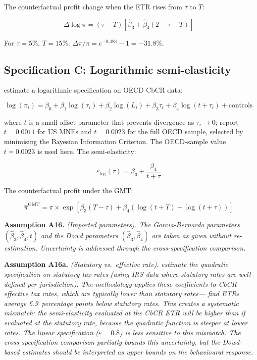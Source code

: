 \documentclass[11pt,a4paper]{article}
\newcommand{\assumption}[2]{\noindent\textbf{Assumption #1.} \textit{#2}\medskip}
\begin{document}
The counterfactual profit change when the ETR rises from $\tau$ to $T$:

\begin{equation}\label{eq:dowd_response}
\Delta \log \pi = (\tau - T)\left[\hat{\beta}_3 + \hat{\beta}_4(2 - \tau - T)\right]
\end{equation}

For $\tau = 5\%$, $T = 15\%$: $\Delta\pi/\pi = e^{-0.383} - 1 = -31.8\%$.

\subsection{Specification C: Logarithmic semi-elasticity}\label{sec:logarithmic}

\citet{garcia2024} estimate a logarithmic specification on OECD CbCR data:

\begin{equation}\label{eq:garcia_spec}
\log(\pi_i) = \beta_0 + \beta_1 \log(\tau_i) + \beta_2 \log(L_i) + \beta_3 \tau_i + \beta_4 \log(t + \tau_i) + \text{controls}
\end{equation}

where $t$ is a small offset parameter that prevents divergence as $\tau_i \to 0$; \citet{garcia2024} report $t = 0.0011$ for US MNEs and $t = 0.0023$ for the full OECD sample, selected by minimising the Bayesian Information Criterion. The OECD-sample value $t = 0.0023$ is used here. The semi-elasticity:

\begin{equation}\label{eq:garcia_se}
\varepsilon_{\log}(\tau) = \beta_3 + \frac{\beta_4}{t + \tau}
\end{equation}

The counterfactual profit under the GMT:

\begin{equation}\label{eq:garcia_response}
\hat{\pi}^{\text{GMT}} = \pi \times \exp\!\left[\beta_3(T - \tau) + \beta_4\left(\log(t + T) - \log(t + \tau)\right)\right]
\end{equation}

\assumption{A16}{(Imported parameters). The Garcia-Bernardo parameters $(\hat{\beta}_3, \hat{\beta}_4, t)$ and the Dowd parameters $(\hat{\beta}_3, \hat{\beta}_4)$ are taken as given without re-estimation. Uncertainty is addressed through the cross-specification comparison.}

\assumption{A16a}{(Statutory vs.\ effective rate). \citet{dowd2017} estimate the quadratic specification on \emph{statutory} tax rates (using IRS data where statutory rates are well-defined per jurisdiction). The methodology applies these coefficients to CbCR \emph{effective} tax rates, which are typically lower than statutory rates---\citet{hugger2025} find ETRs average 6.9~percentage points below statutory rates. This creates a systematic mismatch: the semi-elasticity evaluated at the CbCR ETR will be higher than if evaluated at the statutory rate, because the quadratic function is steeper at lower rates. The linear specification ($\varepsilon = 0.8$) is less sensitive to this mismatch. The cross-specification comparison partially bounds this uncertainty, but the Dowd-based estimates should be interpreted as upper bounds on the behavioural response.}
\end{document}
